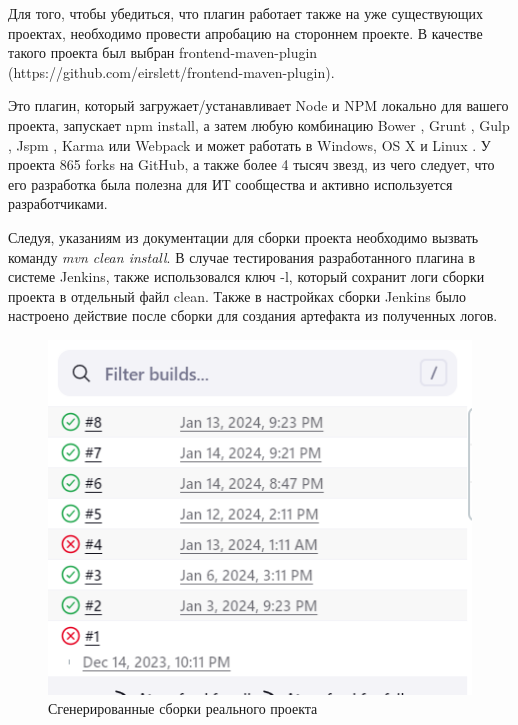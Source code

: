 Для того, чтобы убедиться, что плагин работает также на уже существующих проектах, необходимо провести апробацию на стороннем проекте. В качестве такого проекта был выбран frontend-maven-plugin (https://github.com/eirslett/frontend-maven-plugin). 

Это плагин, который загружает/устанавливает Node и NPM локально для вашего проекта, запускает npm install, а затем любую комбинацию Bower , Grunt , Gulp , Jspm , Karma или Webpack и может работать в Windows, OS X и Linux \cite{frontplugin}. У проекта 865 forks на GitHub, а также более 4 тысяч звезд, из чего следует, что его разработка была полезна для ИТ сообщества и активно используется разработчиками.

Следуя, указаниям из документации для сборки проекта необходимо вызвать команду \textit{mvn clean install}. В случае тестирования разработанного плагина  в системе Jenkins, также использовался ключ -l, который сохранит логи сборки проекта в отдельный файл clean. Также в настройках сборки Jenkins было настроено действие после сборки для создания артефакта из полученных логов.

 \begin{figure}[ht!] 
	\center
	\includegraphics [scale=0.67] {my_folder/images//buildsAprobe}
	\caption{Сгенерированные сборки реального проекта} 
	\label{fig:buildsAprobe}  
\end{figure}

